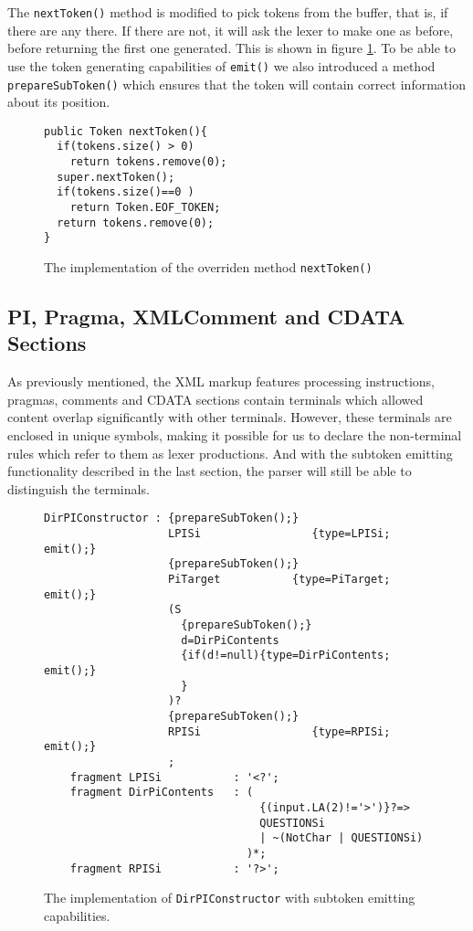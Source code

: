 The \verb!nextToken()! method is modified to pick tokens from the buffer, that is, if there are any there. If there are not, it will ask the lexer to make one as before, before returning the first one generated. This is shown in figure \ref{fig:newNextToken}. To be able to use the token generating capabilities of \verb!emit()! we also introduced a method \verb!prepareSubToken()! which ensures that the token will contain correct information about its position.

\begin{figure}[h!]
\begin{verbatim}
public Token nextToken(){
  if(tokens.size() > 0)
    return tokens.remove(0);
  super.nextToken();
  if(tokens.size()==0 )
    return Token.EOF_TOKEN;
  return tokens.remove(0);
}
\end{verbatim}
\caption[The overridden \texttt{nextToken()}]{The implementation of the overriden method \texttt{nextToken()}}
\label{fig:newNextToken}
\end{figure}


\subsection{PI, Pragma, XMLComment and CDATA Sections}

As previously mentioned, the XML markup features processing instructions, pragmas, comments and CDATA sections contain terminals which allowed content overlap significantly with other terminals. However, these terminals are enclosed in unique symbols, making it possible for us to declare the non-terminal rules which refer to them as lexer productions. And with the subtoken emitting functionality described in the last section, the parser will still be able to distinguish the terminals. 

\begin{figure}[h!]
\begin{verbatim}
DirPIConstructor : {prepareSubToken();}
                   LPISi                 {type=LPISi; emit();}
                   {prepareSubToken();}
                   PiTarget           {type=PiTarget; emit();}
                   (S
                     {prepareSubToken();}
                     d=DirPiContents
                     {if(d!=null){type=DirPiContents; emit();} 
                     } 
                   )?
                   {prepareSubToken();}
                   RPISi                 {type=RPISi; emit();}
                   ;
    fragment LPISi           : '<?';
    fragment DirPiContents   : (
                                 {(input.LA(2)!='>')}?=>
                                 QUESTIONSi 
                                 | ~(NotChar | QUESTIONSi)
                               )*;
    fragment RPISi           : '?>';

\end{verbatim}
\caption[\texttt{DirPIConstructor} emitting subtokens]{The implementation of \texttt{DirPIConstructor} with subtoken emitting capabilities.}
\label{fig:pragmaLEX}
\end{figure}

